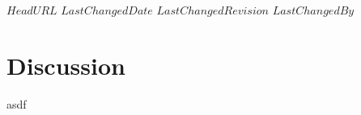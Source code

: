 \svnidlong
{$HeadURL$}
{$LastChangedDate$}
{$LastChangedRevision$}
{$LastChangedBy$}

\section{Discussion}
asdf
